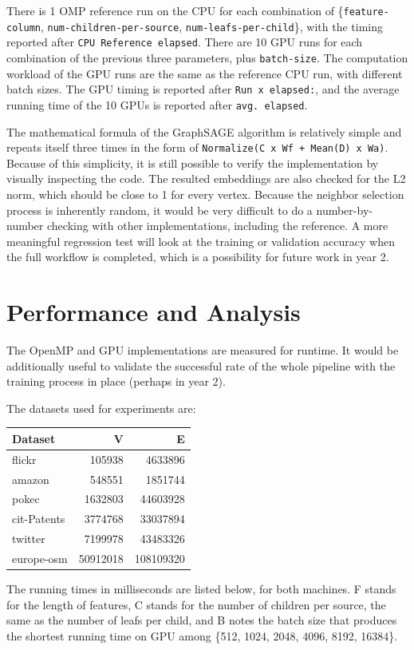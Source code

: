 \documentclass[10pt,oneside]{memoir}
\begin{document}
There is 1 OMP reference run on the CPU for each combination of
\{\texttt{feature-column}, \texttt{num-children-per-source},
\texttt{num-leafs-per-child}\}, with the timing reported after
\texttt{CPU\ Reference\ elapsed}. There are 10 GPU runs for each
combination of the previous three parameters, plus \texttt{batch-size}.
The computation workload of the GPU runs are the same as the reference
CPU run, with different batch sizes. The GPU timing is reported after
\texttt{Run\ x\ elapsed:}, and the average running time of the 10 GPUs
is reported after \texttt{avg.\ elapsed}.

The mathematical formula of the GraphSAGE algorithm is relatively simple
and repeats itself three times in the form of
\texttt{Normalize(C\ x\ Wf\ +\ Mean(D)\ x\ Wa)}. Because of this
simplicity, it is still possible to verify the implementation by
visually inspecting the code. The resulted embeddings are also checked
for the L2 norm, which should be close to 1 for every vertex. Because
the neighbor selection process is inherently random, it would be very
difficult to do a number-by-number checking with other implementations,
including the reference. A more meaningful regression test will look at
the training or validation accuracy when the full workflow is completed,
which is a possibility for future work in year 2.

\hypertarget{performance-and-analysis-2}{%
\section{Performance and Analysis}\label{performance-and-analysis-2}}

The OpenMP and GPU implementations are measured for runtime. It would be
additionally useful to validate the successful rate of the whole
pipeline with the training process in place (perhaps in year 2).

The datasets used for experiments are:

\begin{longtable}[]{@{}lrr@{}}
\toprule
Dataset & V & E\tabularnewline
\midrule
\endhead
flickr & 105938 & 4633896\tabularnewline
amazon & 548551 & 1851744\tabularnewline
pokec & 1632803 & 44603928\tabularnewline
cit-Patents & 3774768 & 33037894\tabularnewline
twitter & 7199978 & 43483326\tabularnewline
europe-osm & 50912018 & 108109320\tabularnewline
\bottomrule
\end{longtable}

The running times in milliseconds are listed below, for both machines. F
stands for the length of features, C stands for the number of children
per source, the same as the number of leafs per child, and B notes the
batch size that produces the shortest running time on GPU among \{512,
1024, 2048, 4096, 8192, 16384\}.
\end{document}
